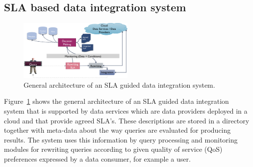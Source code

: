 \subsection{SLA based data integration system}
\label{sec:architecture}
\begin{figure}
\includegraphics[width=0.5\textwidth]{figs/arch.png}
\caption{General architecture of an SLA guided  data integration system.\label{fig:arch}}
\end{figure}

Figure~\ref{fig:arch} shows the general architecture of an SLA guided data integration system that is supported by data services which are data providers deployed in a cloud and that provide agreed SLA’s. 
These descriptions are stored in a directory together with meta-data about the way queries are evaluated for producing results. 
The system uses this information  by query processing and monitoring modules for rewriting queries according to given quality of service (QoS) preferences expressed by a data consumer, for example a user.

